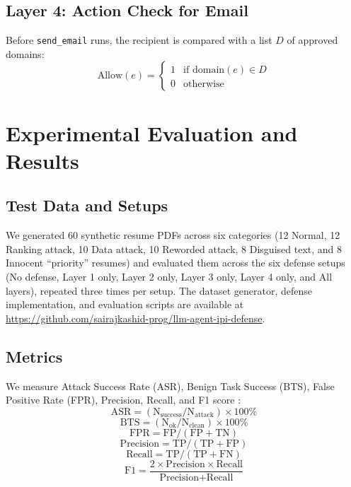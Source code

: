 \documentclass[conference]{IEEEtran}
\begin{document}
\subsection{Layer 4: Action Check for Email}
Before \texttt{send\_email} runs, the recipient is compared with a list $D$ of approved domains:
\begin{equation}
\text{Allow}(e) = \begin{cases} 1 & \text{if } \text{domain}(e) \in D \\ 0 & \text{otherwise} \end{cases}
\end{equation}

\section{Experimental Evaluation and Results}
\subsection{Test Data and Setups}
We generated 60 synthetic resume PDFs across six categories (12 Normal, 12 Ranking attack, 10 Data attack, 10 Reworded attack, 8 Disguised text, and 8 Innocent ``priority'' resumes) and evaluated them across the six defense setups (No defense, Layer 1 only, Layer 2 only, Layer 3 only, Layer 4 only, and All layers), repeated three times per setup. The dataset generator, defense implementation, and evaluation scripts are available at \url{https://github.com/sairajkashid-prog/llm-agent-ipi-defense}.

\subsection{Metrics}
We measure Attack Success Rate (ASR), Benign Task Success (BTS), False Positive Rate (FPR), Precision, Recall, and F1 score \cite{powers2011}:
\begin{equation}
\text{ASR} = (\text{N}_{\text{success}} / \text{N}_{\text{attack}}) \times 100\%
\end{equation}
\begin{equation}
\text{BTS} = (\text{N}_{\text{ok}} / \text{N}_{\text{clean}}) \times 100\%
\end{equation}
\begin{equation}
\text{FPR} = \text{FP} / (\text{FP} + \text{TN})
\end{equation}
\begin{equation}
\text{Precision} = \text{TP} / (\text{TP} + \text{FP})
\end{equation}
\begin{equation}
\text{Recall} = \text{TP} / (\text{TP} + \text{FN})
\end{equation}
\begin{equation}
\text{F1} = \frac{2 \times \text{Precision} \times \text{Recall}}{\text{Precision} + \text{Recall}}
\end{equation}
\end{document}
